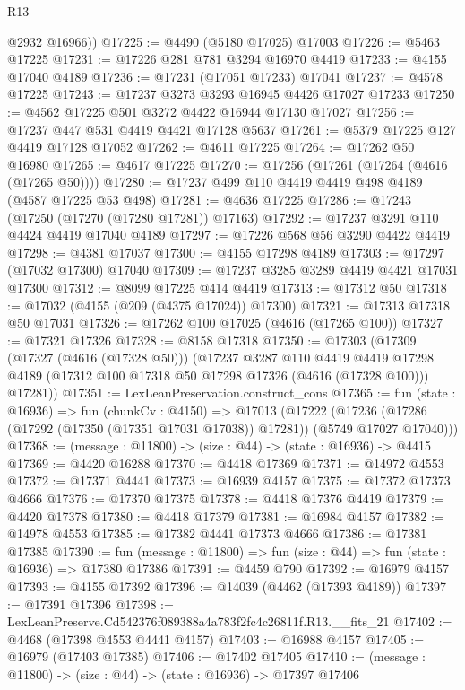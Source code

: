 \begin{lexlean}{R13}
\begin{coremodule}
        @2932
        @16966))
@17225 := @4490 (@5180 @17025) @17003
@17226 := @5463 @17225
@17231 := @17226 @281 @781 @3294 @16970 @4419
@17233 := @4155 @17040 @4189
@17236 := @17231 (@17051 @17233) @17041
@17237 := @4578 @17225
@17243 := @17237 @3273 @3293 @16945 @4426 @17027 @17233
@17250 := @4562 @17225 @501 @3272 @4422 @16944 @17130 @17027
@17256 := @17237 @447 @531 @4419 @4421 @17128 @5637
@17261 := @5379 @17225 @127 @4419 @17128 @17052
@17262 := @4611 @17225
@17264 := @17262 @50 @16980
@17265 := @4617 @17225
@17270 := @17256 (@17261 (@17264 (@4616 (@17265 @50))))
@17280 := @17237 @499 @110 @4419 @4419 @498 @4189 (@4587 @17225 @53 @498)
@17281 := @4636 @17225
@17286 := @17243 (@17250 (@17270 (@17280 @17281)) @17163)
@17292 := @17237 @3291 @110 @4424 @4419 @17040 @4189
@17297 := @17226 @568 @56 @3290 @4422 @4419
@17298 := @4381 @17037
@17300 := @4155 @17298 @4189
@17303 := @17297 (@17032 @17300) @17040
@17309 := @17237 @3285 @3289 @4419 @4421 @17031 @17300
@17312 := @8099 @17225 @414 @4419
@17313 := @17312 @50
@17318 := @17032 (@4155 (@209 (@4375 @17024)) @17300)
@17321 := @17313 @17318 @50 @17031
@17326 := @17262 @100 @17025 (@4616 (@17265 @100))
@17327 := @17321 @17326
@17328 := @8158 @17318
@17350 := @17303
    (@17309
      (@17327 (@4616 (@17328 @50)))
      (@17237
        @3287
        @110
        @4419
        @4419
        @17298
        @4189
        (@17312 @100 @17318 @50 @17298 @17326 (@4616 (@17328 @100)))
        @17281))
@17351 := LexLeanPreservation.construct_cons
@17365 := fun (state : @16936) =>
  fun (chunkCv : @4150) =>
  @17013
    (@17222 (@17236 (@17286 (@17292 (@17350 (@17351 @17031 @17038)) @17281)) (@5749 @17027 @17040)))
@17368 := (message : @11800) -> (size : @44) -> (state : @16936) -> @4415
@17369 := @4420 @16288
@17370 := @4418 @17369
@17371 := @14972 @4553
@17372 := @17371 @4441
@17373 := @16939 @4157
@17375 := @17372 @17373 @4666
@17376 := @17370 @17375
@17378 := @4418 @17376 @4419
@17379 := @4420 @17378
@17380 := @4418 @17379
@17381 := @16984 @4157
@17382 := @14978 @4553
@17385 := @17382 @4441 @17373 @4666
@17386 := @17381 @17385
@17390 := fun (message : @11800) => fun (size : @44) => fun (state : @16936) => @17380 @17386
@17391 := @4459 @790
@17392 := @16979 @4157
@17393 := @4155 @17392
@17396 := @14039 (@4462 (@17393 @4189))
@17397 := @17391 @17396
@17398 := LexLeanPreserve.Cd542376f089388a4a783f2fc4c26811f.R13.__fits_21
@17402 := @4468 (@17398 @4553 @4441 @4157)
@17403 := @16988 @4157
@17405 := @16979 (@17403 @17385)
@17406 := @17402 @17405
@17410 := (message : @11800) -> (size : @44) -> (state : @16936) -> @17397 @17406

\end{coremodule}
\end{lexlean}
